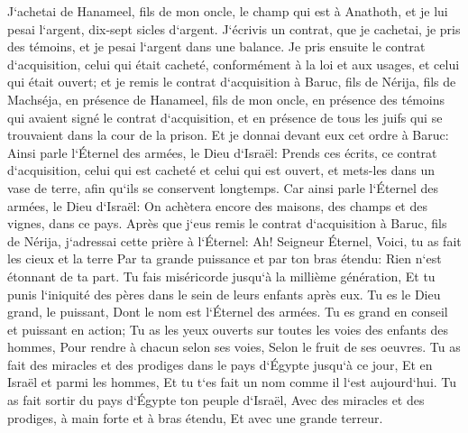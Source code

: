 \verse J`achetai de Hanameel, fils de mon oncle, le champ qui est à Anathoth, et je lui pesai l`argent, dix-sept sicles d`argent. 
\verse J`écrivis un contrat, que je cachetai, je pris des témoins, et je pesai l`argent dans une balance. 
\verse Je pris ensuite le contrat d`acquisition, celui qui était cacheté, conformément à la loi et aux usages, et celui qui était ouvert; 
\verse et je remis le contrat d`acquisition à Baruc, fils de Nérija, fils de Machséja, en présence de Hanameel, fils de mon oncle, en présence des témoins qui avaient signé le contrat d`acquisition, et en présence de tous les juifs qui se trouvaient dans la cour de la prison. 
\verse Et je donnai devant eux cet ordre à Baruc: 
\verse Ainsi parle l`Éternel des armées, le Dieu d`Israël: Prends ces écrits, ce contrat d`acquisition, celui qui est cacheté et celui qui est ouvert, et mets-les dans un vase de terre, afin qu`ils se conservent longtemps. 
\verse Car ainsi parle l`Éternel des armées, le Dieu d`Israël: On achètera encore des maisons, des champs et des vignes, dans ce pays. 
\verse Après que j`eus remis le contrat d`acquisition à Baruc, fils de Nérija, j`adressai cette prière à l`Éternel: 
\verse Ah! Seigneur Éternel, Voici, tu as fait les cieux et la terre Par ta grande puissance et par ton bras étendu: Rien n`est étonnant de ta part. 
\verse Tu fais miséricorde jusqu`à la millième génération, Et tu punis l`iniquité des pères dans le sein de leurs enfants après eux. Tu es le Dieu grand, le puissant, Dont le nom est l`Éternel des armées. 
\verse Tu es grand en conseil et puissant en action; Tu as les yeux ouverts sur toutes les voies des enfants des hommes, Pour rendre à chacun selon ses voies, Selon le fruit de ses oeuvres. 
\verse Tu as fait des miracles et des prodiges dans le pays d`Égypte jusqu`à ce jour, Et en Israël et parmi les hommes, Et tu t`es fait un nom comme il l`est aujourd`hui. 
\verse Tu as fait sortir du pays d`Égypte ton peuple d`Israël, Avec des miracles et des prodiges, à main forte et à bras étendu, Et avec une grande terreur. 
